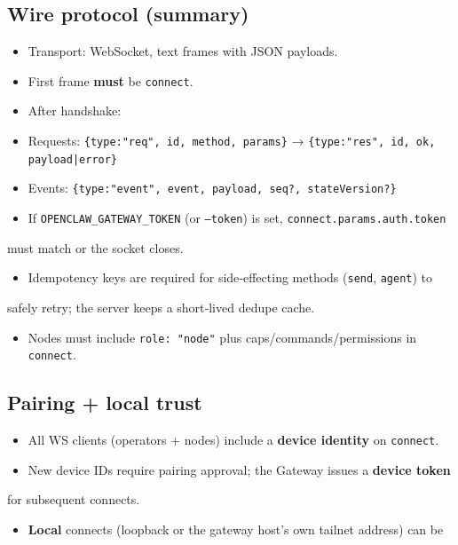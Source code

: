 \subsection{Wire protocol (summary)}


\begin{itemize}
  \item Transport: WebSocket, text frames with JSON payloads.
  \item First frame \textbf{must} be \texttt{connect}.
  \item After handshake:
  \item Requests: \texttt{\{type:"req", id, method, params\}} → \texttt{\{type:"res", id, ok, payload|error\}}
  \item Events: \texttt{\{type:"event", event, payload, seq?, stateVersion?\}}
  \item If \texttt{OPENCLAW\_GATEWAY\_TOKEN} (or \texttt{--token}) is set, \texttt{connect.params.auth.token}
\end{itemize}

must match or the socket closes.
\begin{itemize}
  \item Idempotency keys are required for side‑effecting methods (\texttt{send}, \texttt{agent}) to
\end{itemize}

safely retry; the server keeps a short‑lived dedupe cache.
\begin{itemize}
  \item Nodes must include \texttt{role: "node"} plus caps/commands/permissions in \texttt{connect}.
\end{itemize}


\subsection{Pairing + local trust}


\begin{itemize}
  \item All WS clients (operators + nodes) include a \textbf{device identity} on \texttt{connect}.
  \item New device IDs require pairing approval; the Gateway issues a \textbf{device token}
\end{itemize}

for subsequent connects.
\begin{itemize}
  \item \textbf{Local} connects (loopback or the gateway host’s own tailnet address) can be
\end{itemize}

